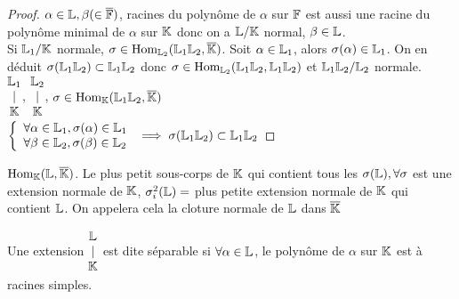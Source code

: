 \documentclass[]{report}
\begin{document}
    \begin{proof}
        $\alpha\in \mathbb{L}, \beta(\in\overline{\mathbb{F}})$, racines du polynôme de $\alpha$ sur $\mathbb{F}$ est aussi une racine du polynôme minimal de $\alpha$ sur $\mathbb{K}$ donc on a $\mathbb{L}/\mathbb{K}$ normal, $\beta \in \mathbb{L}$.\\
        Si $\mathbb{L}_1/\mathbb{K}$ normale, $\sigma\in \text{Hom}_{\mathbb{L}_2}(\mathbb{L}_1\mathbb{L}_2,\overline{\mathbb{K}})$. Soit $\alpha\in \mathbb{L}_1$, alors $\sigma(\alpha)\in \mathbb{L}_1$. On en déduit $\sigma(\mathbb{L}_1\mathbb{L}_2)\subset \mathbb{L}_1\mathbb{L}_2$ donc $\sigma\in \text{Hom}_{\mathbb{L}_2}(\mathbb{L}_1\mathbb{L}_2,\mathbb{L}_1\mathbb{L}_2)$ et $\mathbb{L}_1\mathbb{L}_2/\mathbb{L}_2$ normale.\\
        $\begin{matrix}
            \mathbb{L}_1\\
            |\\
            \mathbb{K}
        \end{matrix}$, $\begin{matrix}
            \mathbb{L}_2\\
            |\\
            \mathbb{K}
        \end{matrix}$, $\sigma\in \text{Hom}_{\mathbb{K}}(\mathbb{L}_1\mathbb{L}_2,\overline{\mathbb{K}})$\\
        $\left\{\begin{array}{ll} \forall \alpha \in \mathbb{L}_1,\sigma(\alpha)\in \mathbb{L}_1\\\forall \beta\in \mathbb{L}_2,\sigma(\beta)\in \mathbb{L}_2 \end{array} \right.\implies \sigma(\mathbb{L}_1\mathbb{L}_2)\subset \mathbb{L}_1\mathbb{L}_2$
    \end{proof}

    \begin{re}{}{}
        $\text{Hom}_{\mathbb{K}}(\mathbb{L},\overline{\mathbb{K}})$. Le plus petit sous-corps de $\mathbb{K}$ qui contient tous les $\sigma(\mathbb{L}),\forall \sigma$ est une extension normale de $\mathbb{K}$, $\sigma_i^2(\mathbb{L})=$ plus petite extension normale de $\mathbb{K}$ qui contient $\mathbb{L}$. On appelera cela la cloture normale de $\mathbb{L}$ dans $\overline{\mathbb{K}}$
    \end{re}

    \begin{df}{}{}
        Une extension $\begin{matrix}
            \mathbb{L}\\
            |\\
            \mathbb{K}
        \end{matrix}$ est dite séparable si $\forall \alpha\in \mathbb{L}$, le polynôme de $\alpha$ sur $\mathbb{K}$ est à racines simples.
    \end{df}
\end{document}
